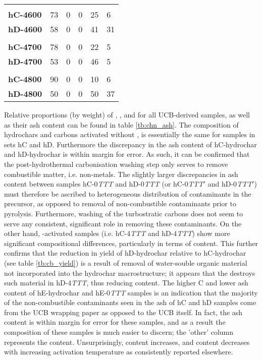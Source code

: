 \begin{table}[t!]
\begin{tabularx}{\textwidth}{lXXXX|X}
        &&&&&\\
        \textbf{hC-4600} & 73 & 0 & 0 & 25 & 6 \\
        \textbf{hD-4600} & 58 & 0 & 0 & 41 & 31 \\
        &&&&&\\
        \textbf{hC-4700} & 78 & 0 & 0 & 22 & 5 \\
        \textbf{hD-4700} & 53 & 0 & 0 & 46 & 5 \\
        &&&&&\\
        \textbf{hC-4800} & 90 & 0 & 0 & 10 & 6 \\
        \textbf{hD-4800} & 50 & 0 & 0 & 50 & 37 \\
    \bottomrule
    \end{tabularx}
\end{table}

Relative proportions (by weight) of , , and  for all UCB-derived samples, as well as their ash content can be found in table \ref{tb:chn_ash}. The composition of hydrochars and carbons activated without , is essentially the same for samples in sets hC and hD. Furthermore the discrepancy in the ash content of hC-hydrochar and hD-hydrochar is within margin for error. As such, it can be confirmed that the post-hydrothermal carbonisation washing step only serves to remove combustible matter, i.e. non-metals. The slightly larger discrepancies in ash content between samples hC-0\textit{TTT} and hD-0\textit{TTT} (or hC-0\textit{TTT}$'$ and hD-0\textit{TTT}$'$) must therefore be ascribed to heterogeneous distribution of contaminants in the precursor, as opposed to removal of non-combustible contaminants prior to pyrolysis. Furthermore, washing of the turbostratic carbons does not seem to serve any consistent, significant role  in removing these contaminants. On the other hand, -activated samples (i.e. hC-4\textit{TTT} and hD-4\textit{TTT}) show more significant compositional differences, particularly in terms of  content. This further confirms that the reduction in yield of hD-hydrochar relative to hC-hydrochar (see table \ref{tb:cb_yield}) is a result of removal of water-souble organic material not incorporated into the hydrochar macrostructure; it appears that the  destroys such material in hD-4\textit{TTT}, thus reducing  content. The higher C and lower ash content of hE-hydrochar and hE-0\textit{TTT} samples is an indication that the majority of the non-combustible contaminants seen in the ash of hC and hD samples come from the UCB wrapping paper as opposed to the UCB itself. In fact, the ash content is within margin for error for these samples, and as a result the composition of these samples is much easier to discern; the 'other' column represents the  content. Unsurprisingly,  content increases, and  content decreases with increasing activation temperature as consistently reported elsewhere.\citep{Blankenship2022Modulating, Sevilla2014Energy}

